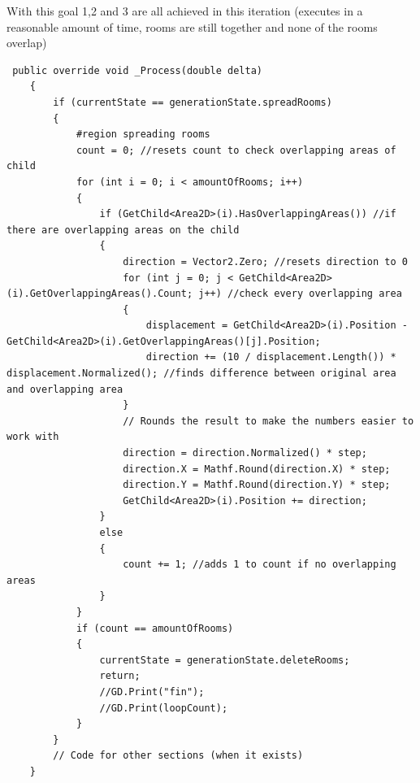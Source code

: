 \documentclass{article}
\begin{document}
With this goal 1,2 and 3 are all achieved in this iteration (executes in a reasonable amount of time, rooms are still together and none of the rooms overlap)
\begin{lstlisting}
 public override void _Process(double delta)
    {
        if (currentState == generationState.spreadRooms)
        {
            #region spreading rooms
            count = 0; //resets count to check overlapping areas of child
            for (int i = 0; i < amountOfRooms; i++)
            {
                if (GetChild<Area2D>(i).HasOverlappingAreas()) //if there are overlapping areas on the child
                {
                    direction = Vector2.Zero; //resets direction to 0
                    for (int j = 0; j < GetChild<Area2D>(i).GetOverlappingAreas().Count; j++) //check every overlapping area
                    {
                        displacement = GetChild<Area2D>(i).Position - GetChild<Area2D>(i).GetOverlappingAreas()[j].Position;
                        direction += (10 / displacement.Length()) * displacement.Normalized(); //finds difference between original area and overlapping area
                    }
                    // Rounds the result to make the numbers easier to work with
                    direction = direction.Normalized() * step;
                    direction.X = Mathf.Round(direction.X) * step;
                    direction.Y = Mathf.Round(direction.Y) * step;
                    GetChild<Area2D>(i).Position += direction;
                }
                else
                {
                    count += 1; //adds 1 to count if no overlapping areas
                }
            }
            if (count == amountOfRooms)
            {
                currentState = generationState.deleteRooms;
                return;
                //GD.Print("fin");
                //GD.Print(loopCount);
            }
		}
		// Code for other sections (when it exists)
	}
\end{lstlisting}
\end{document}
